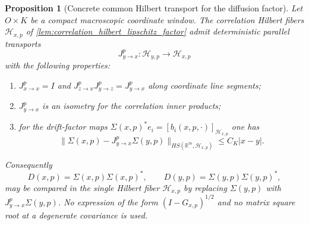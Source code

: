 \documentclass[12pt, letterpaper]{amsart}
\newcommand{\R}{\mathbb{R}}
\theoremstyle{plain}
\newtheorem{proposition}[theorem]{Proposition}
\theoremstyle{definition}
\theoremstyle{remark}
\begin{document}
\begin{proposition}[Concrete common Hilbert transport for the diffusion factor]
\label{prop:concrete_common_hilbert_model}
Let $O\times K$ be a compact macroscopic coordinate window.  The correlation
Hilbert fibers $\mathscr H_{x,p}$ of
\cref{lem:correlation_hilbert_lipschitz_factor} admit deterministic parallel
transports
\begin{equation}
    J_{y\to x}^{p}:\mathscr H_{y,p}\longrightarrow\mathscr H_{x,p}
\end{equation}
with the following properties:
\begin{enumerate}[label=\textup{(\alph*)}, wide, labelindent=0pt]
    \item $J_{x\to x}^{p}=I$ and $J_{z\to x}^{p}J_{y\to z}^{p}=J_{y\to x}^{p}$
    along coordinate line segments;
    \item $J_{y\to x}^{p}$ is an isometry for the correlation inner products;
    \item for the drift-factor maps
    $\Sigma(x,p)^*e_i=[b_i(x,p,\cdot)]_{\mathscr H_{x,p}}$ one has
    \begin{equation}
    \label{eq:transported_sigma_lipschitz}
        \|\Sigma(x,p)-J_{y\to x}^{p}\Sigma(y,p)\|_{HS(\R^m,\mathscr H_{x,p})}
        \le C_K|x-y| .
    \end{equation}
\end{enumerate}
Consequently
\begin{equation}
    D(x,p)=\Sigma(x,p)\Sigma(x,p)^*,
    \qquad
    D(y,p)=\Sigma(y,p)\Sigma(y,p)^*,
\end{equation}
may be compared in the single Hilbert fiber $\mathscr H_{x,p}$ by replacing
$\Sigma(y,p)$ with $J_{y\to x}^{p}\Sigma(y,p)$.  No expression of the form
$(I-G_{x,p})^{1/2}$ and no matrix square root at a degenerate covariance is
used.
\end{proposition}
\end{document}
